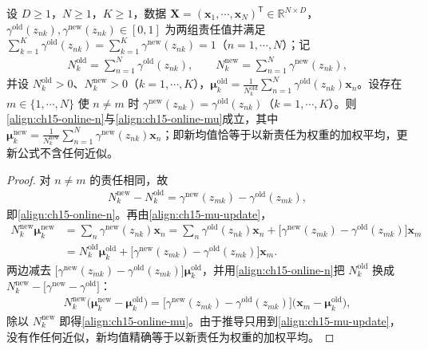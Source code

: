 \documentclass[../../main.tex]{subfiles}
\begin{document}
\begin{proposition}[顺序 EM 的均值更新]\label{proposition:ch15-顺序EM更新}
设 $D\geqslant1$，$N\geqslant1$，$K\geqslant1$，数据 $\bm{X}=(\bm{x}_1,\cdots,\bm{x}_N)^{\mathsf T}\in\mathbb{R}^{N\times D}$，$\gamma^{\text{old}}(z_{nk}),\gamma^{\text{new}}(z_{nk})\in[0,1]$ 为两组责任值并满足 $\sum_{k=1}^{K}\gamma^{\text{old}}(z_{nk})=\sum_{k=1}^{K}\gamma^{\text{new}}(z_{nk})=1$（$n=1,\cdots,N$）；记
\begin{align*}
N_k^{\text{old}}=\sum_{n=1}^{N}\gamma^{\text{old}}(z_{nk}),\qquad N_k^{\text{new}}=\sum_{n=1}^{N}\gamma^{\text{new}}(z_{nk}),
\end{align*}
并设 $N_k^{\text{old}}>0$、$N_k^{\text{new}}>0$（$k=1,\cdots,K$），$\bm{\mu}_k^{\text{old}}=\frac{1}{N_k^{\text{old}}}\sum_{n=1}^{N}\gamma^{\text{old}}(z_{nk})\bm{x}_n$。设存在 $m\in\{1,\cdots,N\}$ 使 $n\neq m$ 时 $\gamma^{\text{new}}(z_{nk})=\gamma^{\text{old}}(z_{nk})$（$k=1,\cdots,K$）。则\eqref{align:ch15-online-n}与\eqref{align:ch15-online-mu}成立，其中 $\bm{\mu}_k^{\text{new}}=\frac{1}{N_k^{\text{new}}}\sum_{n=1}^{N}\gamma^{\text{new}}(z_{nk})\bm{x}_n$；即新均值恰等于以新责任为权重的加权平均，更新公式不含任何近似。
\end{proposition}
\begin{proof}
对 $n\neq m$ 的责任相同，故
\begin{align*}
N_k^{\text{new}}-N_k^{\text{old}}=\gamma^{\text{new}}(z_{mk})-\gamma^{\text{old}}(z_{mk}),
\end{align*}
即\eqref{align:ch15-online-n}。再由\eqref{align:ch15-mu-update}，
\begin{align*}
N_k^{\text{new}}\bm{\mu}_k^{\text{new}}
&=\sum_{n}\gamma^{\text{new}}(z_{nk})\bm{x}_n
=\sum_{n}\gamma^{\text{old}}(z_{nk})\bm{x}_n+\big[\gamma^{\text{new}}(z_{mk})-\gamma^{\text{old}}(z_{mk})\big]\bm{x}_m\\
&=N_k^{\text{old}}\bm{\mu}_k^{\text{old}}+\big[\gamma^{\text{new}}(z_{mk})-\gamma^{\text{old}}(z_{mk})\big]\bm{x}_m.
\end{align*}
两边减去 $\big[\gamma^{\text{new}}(z_{mk})-\gamma^{\text{old}}(z_{mk})\big]\bm{\mu}_k^{\text{old}}$，并用\eqref{align:ch15-online-n}把 $N_k^{\text{old}}$ 换成 $N_k^{\text{new}}-\big[\gamma^{\text{new}}-\gamma^{\text{old}}\big]$：
\begin{align*}
N_k^{\text{new}}\big(\bm{\mu}_k^{\text{new}}-\bm{\mu}_k^{\text{old}}\big)=\big[\gamma^{\text{new}}(z_{mk})-\gamma^{\text{old}}(z_{mk})\big]\big(\bm{x}_m-\bm{\mu}_k^{\text{old}}\big),
\end{align*}
除以 $N_k^{\text{new}}$ 即得\eqref{align:ch15-online-mu}。由于推导只用到\eqref{align:ch15-mu-update}，没有作任何近似，新均值精确等于以新责任为权重的加权平均。
\end{proof}
\end{document}
